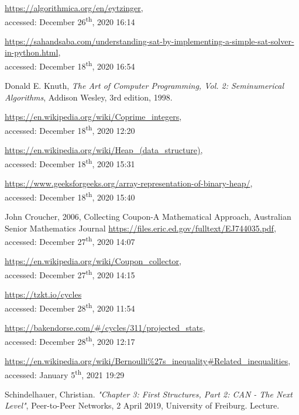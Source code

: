 \documentclass{article}
\begin{document}
\begin{thebibliography}{9}
    \url{https://algorithmica.org/en/eytzinger},\\
    accessed: December 26\textsuperscript{th}, 2020 16:14

    \url{https://sahandsaba.com/understanding-sat-by-implementing-a-simple-sat-solver-in-python.html},\\
    accessed: December 18\textsuperscript{th}, 2020 16:54

    Donald E. Knuth,
    \textit{The Art of Computer Programming, Vol. 2: Seminumerical Algorithms},
    Addison Wesley,
    3rd edition,
    1998.

    \url{https://en.wikipedia.org/wiki/Coprime_integers},\\
    accessed: December 18\textsuperscript{th}, 2020 12:20

    \url{https://en.wikipedia.org/wiki/Heap_(data_structure)},\\
    accessed: December 18\textsuperscript{th}, 2020 15:31

    \url{https://www.geeksforgeeks.org/array-representation-of-binary-heap/},\\
    accessed: December 18\textsuperscript{th}, 2020 15:40

     John Croucher, 2006, Collecting Coupon-A Mathematical Approach, Australian Senior Mathematics Journal
    \url{https://files.eric.ed.gov/fulltext/EJ744035.pdf},\\
    accessed: December 27\textsuperscript{th}, 2020 14:07
    
    \url{https://en.wikipedia.org/wiki/Coupon_collector},\\
    accessed: December 27\textsuperscript{th}, 2020 14:15

    \url{https://tzkt.io/cycles} \\
    accessed: December 28\textsuperscript{th}, 2020 11:54

    \url{https://bakendorse.com/#/cycles/311/projected_stats},\\
    accessed: December 28\textsuperscript{th}, 2020 12:17
    
    \url{https://en.wikipedia.org/wiki/Bernoulli\%27s_inequality#Related_inequalities},\\
    accessed: January 5\textsuperscript{th}, 2021 19:29
    
    Schindelhauer, Christian. \textit{"Chapter 3: First Structures, Part 2: CAN - The Next Level"}, Peer-to-Peer Networks, 2 April 2019, University of Freiburg. Lecture.
\end{thebibliography}
\end{document}
